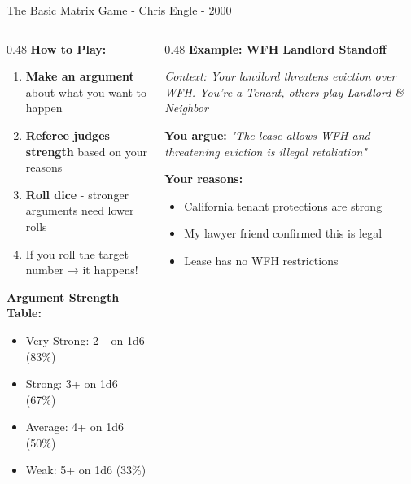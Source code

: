 \documentclass[aspectratio=169]{beamer}
\begin{document}
\begin{frame}{The Basic Matrix Game - Chris Engle - 2000}
  \small
  \begin{columns}[T]
    \begin{column}{0.48\textwidth}
      \textbf{How to Play:}
      \footnotesize
      \begin{enumerate}\setlength\itemsep{0.2em}
        \item \textbf{Make an argument} about what you want to happen
        \item \textbf{Referee judges strength} based on your reasons
        \item \textbf{Roll dice} - stronger arguments need lower rolls
        \item If you roll the target number → it happens!
      \end{enumerate}

      \vspace{0.4em}
      \normalsize
      \textbf{Argument Strength Table:}
      \footnotesize
      \begin{itemize}\setlength\itemsep{0em}
        \item Very Strong: 2+ on 1d6 (83\%)
        \item Strong: 3+ on 1d6 (67\%)
        \item Average: 4+ on 1d6 (50\%)
        \item Weak: 5+ on 1d6 (33\%)
      \end{itemize}
    \end{column}

    \begin{column}{0.48\textwidth}
      \textbf{Example: WFH Landlord Standoff}

      \vspace{0.1em}
      \scriptsize\textit{Context: Your landlord threatens eviction over WFH. You're a Tenant, others play Landlord \& Neighbor}

      \vspace{0.1em}
      \footnotesize
      \textbf{You argue:} \textit{"The lease allows WFH and threatening eviction is illegal retaliation"}

      \vspace{0.1em}
      \textbf{\textcolor{green!60!black}{Your reasons:}}
      \begin{itemize}\setlength\itemsep{0em}
        \item California tenant protections are strong
        \item My lawyer friend confirmed this is legal
        \item Lease has no WFH restrictions
      \end{itemize}


\end{column}
\end{columns}
\end{frame}
\end{document}

